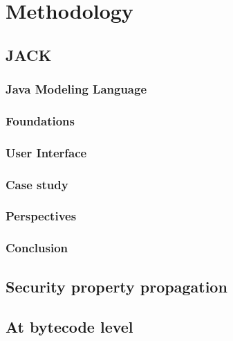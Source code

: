 \chapter{Methodology}
\section{JACK}

\subsection{Java Modeling Language}

\subsection{Foundations}

\subsection{User Interface}

\subsection{Case study}

\subsection{Perspectives}

\subsection{Conclusion}


\section{Security property propagation}




%


\section{At bytecode level}








